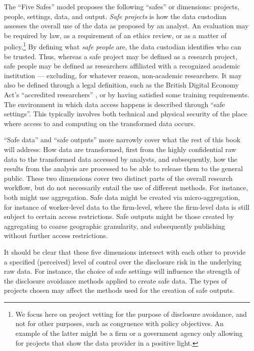 The ``Five Safes'' model proposes the following ``safes'' or dimensions:  projects,  people,  settings, data, and output. \textit{Safe projects} is how the data custodian assesses the overall use of the data as proposed by an analyst. An evaluation may be required by law, as a requirement of an ethics review, or as a matter of policy.\footnote{We focus here on project vetting for the purpose of disclosure avoidance, and not for other purposes, such as congruence with policy objectives. An example of the latter might be a firm or a government agency only allowing for projects that show the data provider in a positive light.} By defining what \textit{safe people} are, the data custodian identifies who can be trusted. Thus, whereas a safe project may be defined as a research project, safe people may be defined as researchers affiliated with a recognized academic institution --- excluding, for whatever reason, non-academic researchers. It may also be defined through a legal definition, such as the British Digital Economy Act's ``accredited researchers'' \cite{uk_government_digital_2020}, or by having satisfied some training requirements. 
The environment in which data access happens is described through ``safe settings''. This typically involves both technical and physical security of the place where access to and computing on the transformed data occurs. 

``Safe data'' and ``safe outputs'' more narrowly cover what the rest of this book will address: How data are transformed, first from the highly confidential raw data to the transformed data accessed by analysts, and subsequently, how the results from the analysis are processed to be able to release them to the general public. These two dimensions cover two distinct parts of the overall research workflow, but do not necessarily entail the use of different methods. For instance, both might use aggregation. Safe data might be created via micro-aggregation, for instance of worker-level data to the firm-level, where the firm-level data is still subject to certain access restrictions. Safe outputs might be those created by aggregating to coarse geographic granularity, and subsequently publishing without further access restrictions. 

It should be clear that these five dimensions intersect with each other to provide a specified (perceived) level of control over the disclosure risk in the underlying raw data. For instance, the choice of safe settings will influence the strength of the disclosure avoidance methods applied to create safe data. The types of projects chosen may affect the methods used for the creation of safe outputs. 


